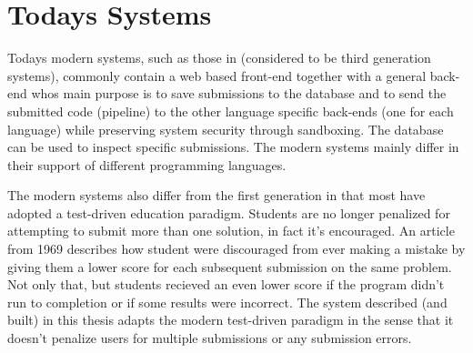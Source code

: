 \section{Todays Systems} \label{sec:todays_systems}
Todays modern systems, such as those in \cite{Gradebot} \cite{Suleman} \cite{GenerationReview}  \cite{Kattis} \cite{Amelung} (considered to be third generation systems), commonly contain a web based front-end together with a general back-end whos main purpose is to save submissions to the database and to send the submitted code (pipeline) to the other language specific back-ends (one for each language) while preserving system security through sandboxing. The database can be used to inspect specific submissions. The modern systems mainly differ in their support of different programming languages.

The modern systems also differ from the first generation in that most have adopted a test-driven education paradigm. Students are no longer penalized for attempting to submit more than one solution, in fact it's encouraged. An article from 1969 \cite{GradingScheme} describes how student were discouraged from ever making a mistake by giving them a lower score for each subsequent submission on the same problem. Not only that, but students recieved an even lower score if the program didn't run to completion or if some results were incorrect. The system described (and built) in this thesis adapts the modern test-driven paradigm in the sense that it doesn't penalize users for multiple submissions or any submission errors.